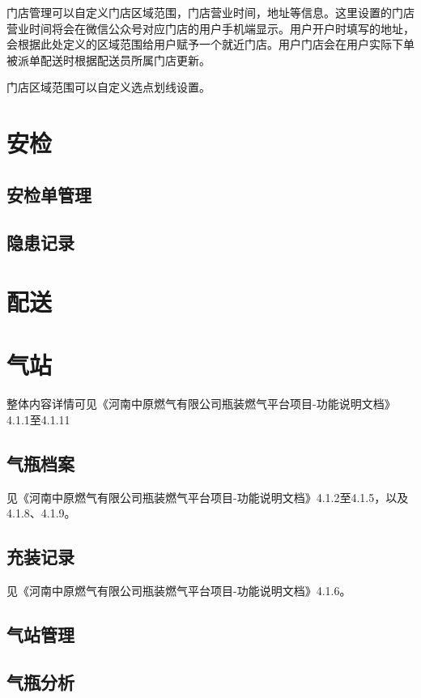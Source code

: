 \documentclass[UTF8]{ctexart}
\begin{document}
门店管理可以自定义门店区域范围，门店营业时间，地址等信息。这里设置的门店营业时间将会在微信公众号对应门店的用户手机端显示。用户开户时填写的地址，会根据此处定义的区域范围给用户赋予一个就近门店。用户门店会在用户实际下单被派单配送时根据配送员所属门店更新。


门店区域范围可以自定义选点划线设置。



\section{安检}

\subsection{安检单管理}

\subsection{隐患记录}


\section{配送}


\section{气站}

整体内容详情可见《河南中原燃气有限公司瓶装燃气平台项目-功能说明文档》4.1.1至4.1.11

\subsection{气瓶档案}

见《河南中原燃气有限公司瓶装燃气平台项目-功能说明文档》4.1.2至4.1.5，以及4.1.8、4.1.9。

\subsection{充装记录}

见《河南中原燃气有限公司瓶装燃气平台项目-功能说明文档》4.1.6。

\subsection{气站管理}



\subsection{气瓶分析}
\end{document}
